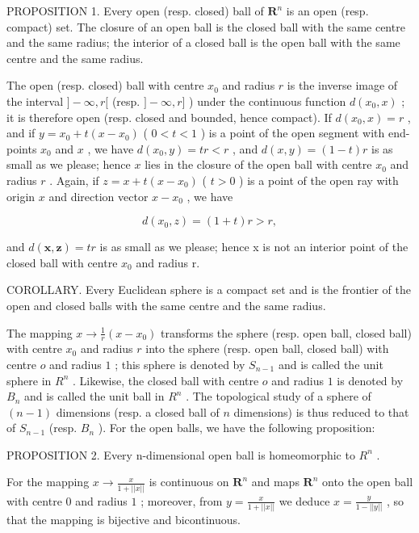 PROPOSITION 1. Every open (resp. closed) ball of \(\mathbf{R}^n\) is an open (resp. compact) set. The closure of an open ball is the closed ball with the same centre and the same radius; the interior of a closed ball is the open ball with the same centre and the same radius.

The open (resp. closed) ball with centre \(x_0\) and radius \(r\) is the inverse image of the interval \(] - \infty, r[\) (resp. \(] - \infty, r]\) ) under the continuous function \(d(x_0, x)\) ; it is therefore open (resp. closed and bounded, hence compact). If \(d(x_0, x) = r\) , and if \(y = x_0 + t(x - x_0)\) ( \(0 < t < 1\) ) is a point of the open segment with end-points \(x_0\) and \(x\) , we have \(d(x_0, y) = tr < r\) , and \(d(x, y) = (1 - t)r\) is as small as we please; hence \(x\) lies in the closure of the open ball with centre \(x_0\) and radius \(r\) . Again, if \(z = x + t(x - x_0)\) ( \(t > 0\) ) is a point of the open ray with origin \(x\) and direction vector \(x - x_0\) , we have

\[
d (x _ {0}, z) = (1 + t) r > r,
\]

and \(d(\boldsymbol{x}, \boldsymbol{z}) = tr\) is as small as we please; hence x is not an interior point of the closed ball with centre \(x_{0}\) and radius r.

COROLLARY. Every Euclidean sphere is a compact set and is the frontier of the open and closed balls with the same centre and the same radius.

The mapping \(x \to \frac{1}{r} (x - x_0)\) transforms the sphere (resp. open ball, closed ball) with centre \(x_0\) and radius \(r\) into the sphere (resp. open ball, closed ball) with centre \(o\) and radius \(1\) ; this sphere is denoted by \(S_{n-1}\) and is called the unit sphere in \(R^n\) . Likewise, the closed ball with centre \(o\) and radius \(1\) is denoted by \(B_n\) and is called the unit ball in \(R^n\) . The topological study of a sphere of \((n - 1)\) dimensions (resp. a closed ball of \(n\) dimensions) is thus reduced to that of \(S_{n-1}\) (resp. \(B_n\) ). For the open balls, we have the following proposition:

PROPOSITION 2. Every n-dimensional open ball is homeomorphic to \(R^{n}\) .

For the mapping \(x \to \frac{x}{1 + ||x||}\) is continuous on \(\mathbf{R}^n\) and maps \(\mathbf{R}^n\) onto the open ball with centre \(0\) and radius \(1\) ; moreover, from \(y = \frac{x}{1 + ||x||}\) we deduce \(x = \frac{y}{1 - ||y||}\) , so that the mapping is bijective and bicontinuous.


